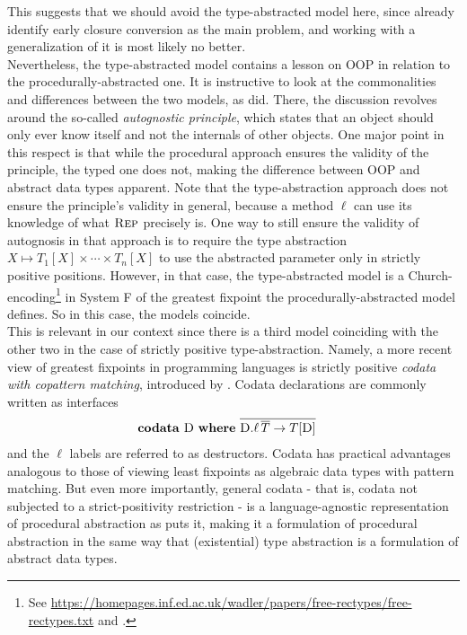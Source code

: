 This suggests that we should avoid the type-abstracted model here, since \citet{7e4a991f} already identify early closure conversion as the main problem, and working with a generalization of it is most likely no better.
\\
Nevertheless, the type-abstracted model contains a lesson on OOP in relation to the procedurally-abstracted one.
It is instructive to look at the commonalities and differences between the two models, as \citet{cook09understanding} did.
There, the discussion revolves around the so-called \emph{autognostic principle}, which states that an object should only ever know itself and not the internals of other objects.
One major point in this respect is that while the procedural approach ensures the validity of the principle, the typed one does not, making the difference between OOP and abstract data types apparent.
Note that the type-abstraction approach does not ensure the principle's validity in general, because a method $\ell$ can use its knowledge of what $\textsc{Rep}$ precisely is.
One way to still ensure the validity of autognosis in that approach is to require the type abstraction $X \mapsto T_{1}[X] \times \cdots \times T_{n}[X]$ to use the abstracted parameter only in strictly positive positions.
However, in that case, the type-abstracted model is a Church-encoding\footnote{See \href{https://homepages.inf.ed.ac.uk/wadler/papers/free-rectypes/free-rectypes.txt}{https://homepages.inf.ed.ac.uk/wadler/papers/free-rectypes/free-rectypes.txt} and \cite{387458b4}.} in System F of the greatest fixpoint the procedurally-abstracted model defines.
So in this case, the models coincide.
\\
This is relevant in our context since there is a third model coinciding with the other two in the case of strictly positive type-abstraction.
Namely, a more recent view of greatest fixpoints in programming languages is strictly positive \emph{codata with copattern matching}, introduced by \cite{abel13copatterns}.
Codata declarations are commonly written as interfaces
\begin{align*}
  &
  \mathbf{codata}\
  \textsc{D}\
  \mathbf{where}\
  \overline{\textsc{D}.\ell\,\overline{T} \to T[\textsc{D}]}
\end{align*}
and the $\ell$ labels are referred to as destructors.
Codata has practical advantages analogous to those of viewing least fixpoints as algebraic data types with pattern matching.
But even more importantly, general codata - that is, codata not subjected to a strict-positivity restriction - is a {\glqq}language-agnostic representation of procedural abstraction{\grqq} as \citet{downen2019codata} puts it, making it a formulation of procedural abstraction in the same way that (existential) type abstraction is a formulation of abstract data types.
